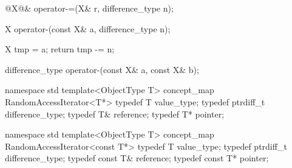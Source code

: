\documentclass[american,twoside]{book}
\begin{document}
\begin{itemdecl}
@\textcolor{addclr}{X}@& operator-=(X& r, difference_type n);
\end{itemdecl}

\pnum
{}

\begin{itemdecl}
X operator-(const X& a, difference_type n);
\end{itemdecl}

\pnum
{}
\begin{codeblock}
{ X tmp = a;
  return tmp -= n; }
\end{codeblock}

\begin{itemdecl}
difference_type operator-(const X& a, const X& b);
\end{itemdecl}

\pnum
{}

\pnum
{}

\pnum
{}

\pnum
{}

\begin{codeblock}
namespace std {
  template<ObjectType T> concept_map RandomAccessIterator<T*> {
    typedef T value_type;
    typedef ptrdiff_t difference_type;
    typedef T& reference;
    typedef T* pointer;
  }
}
\end{codeblock}


\begin{codeblock}
namespace std {
  template<ObjectType T> concept_map RandomAccessIterator<const T*> {
    typedef T value_type;
    typedef ptrdiff_t difference_type;
    typedef const T& reference;
    typedef const T* pointer;
  }
}
\end{codeblock}

\pnum
{}
\end{document}
